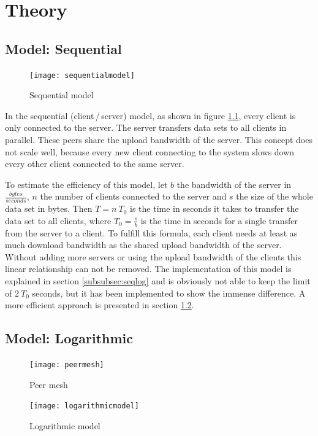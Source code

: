 \chapter{Theory}
\label{ch:theory}

\section{Model: Sequential}
\label{sec:sequentialmodel}

\begin{figure}[ht]
	\centering
	\texttt{[image: sequentialmodel]}
	\caption{Sequential model}
	\label{fig:sequentialmodel}
\end{figure}

In the sequential (client\,/\,server) model, as shown in figure \ref{fig:sequentialmodel}, every client is only connected to the server. The server transfers data sets to all clients in parallel. These peers share the upload bandwidth of the server. This concept does not scale well, because every new client connecting to the system slows down every other client connected to the same server. 

To estimate the efficiency of this model, let $b$ the bandwidth of the server in $\frac{bytes}{seconds}$, $n$ the number of clients connected to the server and $s$ the size of the whole data set in bytes. Then $T= n\:T_0$ is the time in seconds it takes to transfer the data set to all clients, where $T_0=\frac{s}{b}$ is the time in seconds for a single transfer from the server to a client. To fulfill this formula, each client needs at least as much download bandwidth as the shared upload bandwidth of the server. Without adding more servers or using the upload bandwidth of the clients this linear relationship can not be removed. The implementation of this model is explained in section \ref{subsubsec:seqlog} and is obviously not able to keep the limit of $2\:T_0$ seconds, but it has been implemented to show the immense difference. A more efficient approach is presented in section \ref{sec:logarithmicmodel}.

\pagebreak
\section{Model: Logarithmic}
\label{sec:logarithmicmodel}

\begin{figure} [ht]
	\centering
	\begin{minipage}[b]{0.4\linewidth}
		\texttt{[image: peermesh]}
		\caption{Peer mesh}
		\label{fig:peermesh}
	\end{minipage}
	\hspace{0.1\linewidth}
	\begin{minipage}[b]{0.4\linewidth}
		\texttt{[image: logarithmicmodel]}
		\caption{Logarithmic model}
		\label{fig:logarithmicmodel}
	\end{minipage}

\end{figure}


